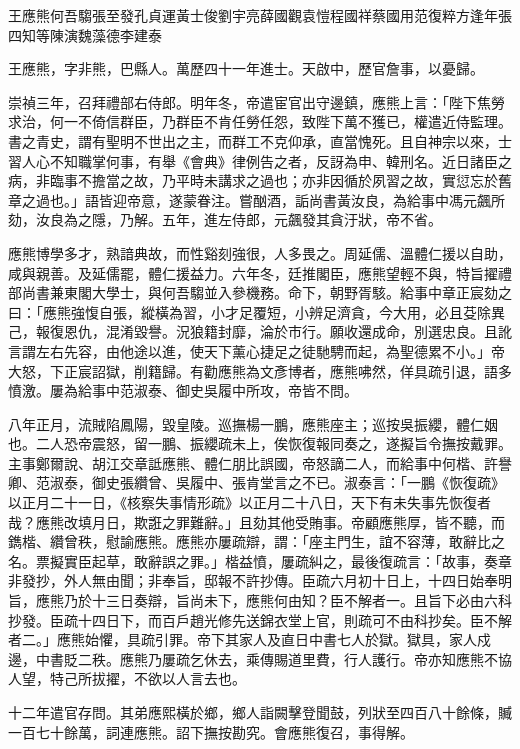 
\begin{pinyinscope}
王應熊何吾騶張至發孔貞運黃士俊劉宇亮薛國觀袁愷程國祥蔡國用范復粹方逢年張四知等陳演魏藻德李建泰

王應熊，字非熊，巴縣人。萬歷四十一年進士。天啟中，歷官詹事，以憂歸。

崇禎三年，召拜禮部右侍郎。明年冬，帝遣宦官出守邊鎮，應熊上言：「陛下焦勞求治，何一不倚信群臣，乃群臣不肯任勞任怨，致陛下萬不獲已，權遣近侍監理。書之青史，謂有聖明不世出之主，而群工不克仰承，直當愧死。且自神宗以來，士習人心不知職掌何事，有舉《會典》律例告之者，反訝為申、韓刑名。近日諸臣之病，非臨事不擔當之故，乃平時未講求之過也；亦非因循於夙習之故，實愆忘於舊章之過也。」語皆迎帝意，遂蒙眷注。嘗酗酒，詬尚書黃汝良，為給事中馮元飆所劾，汝良為之隱，乃解。五年，進左侍郎，元飆發其貪汙狀，帝不省。

應熊博學多才，熟諳典故，而性谿刻強很，人多畏之。周延儒、溫體仁援以自助，咸與親善。及延儒罷，體仁援益力。六年冬，廷推閣臣，應熊望輕不與，特旨擢禮部尚書兼東閣大學士，與何吾騶並入參機務。命下，朝野胥駭。給事中章正宸劾之曰：「應熊強愎自張，縱橫為習，小才足覆短，小辨足濟貪，今大用，必且芟除異己，報復恩仇，混淆毀譽。況狼籍封靡，淪於市行。願收還成命，別選忠良。且訛言謂左右先容，由他途以進，使天下薰心捷足之徒馳騁而起，為聖德累不小。」帝大怒，下正宸詔獄，削籍歸。有勸應熊為文彥博者，應熊咈然，佯具疏引退，語多憤激。屢為給事中范淑泰、御史吳履中所攻，帝皆不問。

八年正月，流賊陷鳳陽，毀皇陵。巡撫楊一鵬，應熊座主；巡按吳振纓，體仁姻也。二人恐帝震怒，留一鵬、振纓疏未上，俟恢復報同奏之，遂擬旨令撫按戴罪。主事鄭爾說、胡江交章詆應熊、體仁朋比誤國，帝怒謫二人，而給事中何楷、許譽卿、范淑泰，御史張纘曾、吳履中、張肯堂言之不已。淑泰言：「一鵬《恢復疏》以正月二十一日，《核察失事情形疏》以正月二十八日，天下有未失事先恢復者哉？應熊改填月日，欺誑之罪難辭。」且劾其他受賄事。帝顧應熊厚，皆不聽，而鐫楷、纘曾秩，慰諭應熊。應熊亦屢疏辯，謂：「座主門生，誼不容薄，敢辭比之名。票擬實臣起草，敢辭誤之罪。」楷益憤，屢疏糾之，最後復疏言：「故事，奏章非發抄，外人無由聞；非奉旨，邸報不許抄傳。臣疏六月初十日上，十四日始奉明旨，應熊乃於十三日奏辯，旨尚未下，應熊何由知？臣不解者一。且旨下必由六科抄發。臣疏十四日下，而百戶趙光修先送錦衣堂上官，則疏可不由科抄矣。臣不解者二。」應熊始懼，具疏引罪。帝下其家人及直日中書七人於獄。獄具，家人戍邊，中書貶二秩。應熊乃屢疏乞休去，乘傳賜道里費，行人護行。帝亦知應熊不協人望，特己所拔擢，不欲以人言去也。

十二年遣官存問。其弟應熙橫於鄉，鄉人詣闕擊登聞鼓，列狀至四百八十餘條，贓一百七十餘萬，詞連應熊。詔下撫按勘究。會應熊復召，事得解。


\end{pinyinscope}
